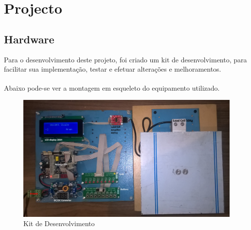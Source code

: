 \chapter{Projecto}
\section{Hardware}
Para o desenvolvimento deste projeto, foi criado um kit de desenvolvimento, para facilitar sua implementação, testar e efetuar alterações e melhoramentos.\\
\\
Abaixo pode-se ver a montagem em esqueleto do equipamento utilizado.
\newline
\begin{figure}[H]
	\centering
	\includegraphics[scale=0.15]{./image/PESTA/kit/Kit_Desenvolvimento_2.jpg}
	\caption{Kit de Desenvolvimento}
	\label{Kit_Desenvolvimento_2}
\end{figure}
\newpage
